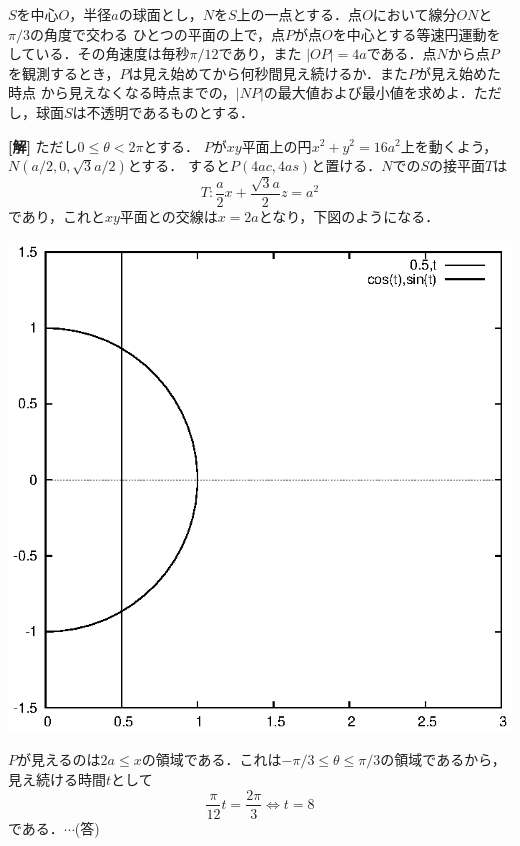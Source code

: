 \documentclass[a4j]{jarticle}
\begin{document}

     \begin{oframed}
     $S$を中心$O$，半径$a$の球面とし，$N$を$S$上の一点とする．点$O$において線分$ON$と$\pi/3$の角度で交わる
     ひとつの平面の上で，点$P$が点$O$を中心とする等速円運動をしている．その角速度は毎秒$\pi/12$であり，また
     $|OP|=4a$である．点$N$から点$P$を観測するとき，$P$は見え始めてから何秒間見え続けるか．また$P$が見え始めた時点
     から見えなくなる時点までの，$|NP|$の最大値および最小値を求めよ．ただし，球面$S$は不透明であるものとする．
     \end{oframed}

\setlength{\columnseprule}{0.4pt}
\begin{multicols}{2}
{\bf[解]} \1 ただし$0\le\theta<2\pi$とする．
$P$が$xy$平面上の円$x^2+y^2=16a^2$上を動くよう，$N(a/2,0,\sqrt{3}a/2)$とする．
すると$P(4ac,4as)$と置ける．$N$での$S$の接平面$T$は
     \[T:\frac{a}{2}x+\frac{\sqrt{3}a}{2}z=a^2\]
であり，これと$xy$平面との交線は$x=2a$となり，下図のようになる．
\vspace{-3zh} 
     \begin{center}
     \includegraphics[scale=0.5]{ut-73-1.eps}
     \end{center}
\vspace{2zh}     
$P$が見えるのは$2a\le x$の領域である．これは$-\pi/3\le\theta\le\pi/3$の領域であるから，見え続ける時間$t$として
     \[\frac{\pi}{12}t=\frac{2\pi}{3} \Longleftrightarrow t=8\]
である．$\cdots$(答)


\end{multicols}
\end{document}
